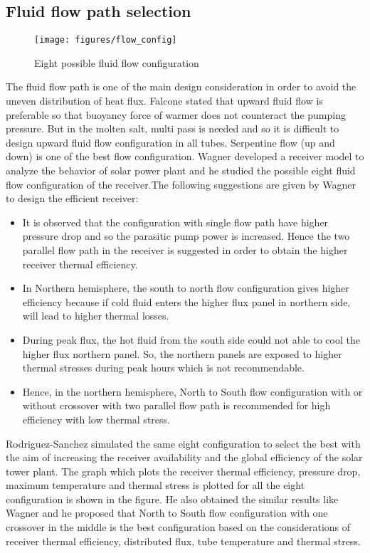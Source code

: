 \subsection{Fluid flow path selection}
\begin{figure}[h]
	\texttt{[image: figures/flow\_config]}
	\centering
	\caption{Eight possible fluid flow configuration}	
\end{figure}
The fluid flow path is one of the main design consideration in order to avoid the uneven distribution of heat flux. Falcone \cite{Falcone.1986} stated that upward fluid flow is preferable so that buoyancy force of warmer does not counteract the pumping pressure. But in the molten salt, multi pass is needed and so it is difficult to design upward fluid flow configuration in all tubes. Serpentine flow (up and down) is one of the best flow configuration. Wagner \cite{Wagner.2008} developed a receiver model to analyze the behavior of solar power plant and he studied the possible eight fluid flow configuration of the receiver.The following suggestions are given by Wagner to design the efficient receiver:
\begin{itemize}
	\item It is observed that the configuration with single flow path have higher pressure drop and so the parasitic pump power is increased. Hence the two parallel flow path in the receiver is suggested in order to obtain the higher receiver thermal efficiency. 
	\item In Northern hemisphere, the south to north flow configuration gives higher efficiency because if cold fluid enters the higher flux panel in northern side, will lead to higher thermal losses. 
	\item During peak flux, the hot fluid from the south side could not able to cool the higher flux northern panel. So, the northern panels are exposed to higher thermal stresses during peak hours  which is not recommendable.
	\item Hence, in the northern hemisphere, North to South flow configuration with or without crossover with two parallel flow path is recommended for high efficiency with low thermal stress.
\end{itemize}
Rodriguez-Sanchez \cite{Rodriguez.2015} simulated the same eight configuration to select the best with the aim of increasing the receiver availability and the global efficiency of the solar tower plant. The graph which plots the receiver thermal efficiency, pressure drop, maximum temperature and thermal stress is plotted for all the eight configuration is shown in the figure. He also obtained the similar results like Wagner and he proposed that North to South flow configuration with one crossover in the middle is the best configuration based on the considerations of receiver thermal efficiency, distributed flux, tube temperature and thermal stress.

